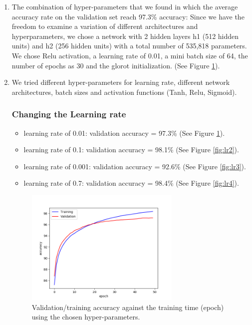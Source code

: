 \documentclass[a4paper]{article}
\begin{document}
\begin{enumerate}

\item
The combination of hyper-parameters that we found in which the average accuracy rate on the validation set reach 97.3\% accuracy:
Since we have the freedom to examine a variation of different architectures and hyperparameters, we chose a network with 2 hidden layers h1 (512 hidden units) and h2 (256 hidden units) with a total number of 535,818 parameters. We chose Relu activation, a learning rate of 0.01, a mini batch size of 64, the number of epochs as 30 and the glorot initialization. (See Figure \ref{fig:hyper}).

\item 
We tried different hyper-parameters for learning rate, different network architectures, batch sizes and activation functions (Tanh, Relu, Sigmoid).

\subsubsection{Changing the Learning rate}


\begin{itemize}

\item learning rate of 0.01: validation accuracy = 97.3\% (See Figure \ref{fig:hyper}).

\item learning rate of 0.1: validation accuracy = 98.1\% (See Figure \ref{fig:lr2}).

\item learning rate of 0.001: validation accuracy = 92.6\% (See Figure \ref{fig:lr3}).  
 
\item learning rate of 0.7: validation accuracy = 98.4\% (See Figure \ref{fig:lr4}). 
 
\end{itemize}

\begin{figure}
\centering
\includegraphics[width=0.7\textwidth]{acc_hyper.png}
\caption{\label{fig:hyper}Validation/training accuracy against the training time (epoch) using the chosen hyper-parameters.}
\end{figure}


\end{enumerate}
\end{document}
